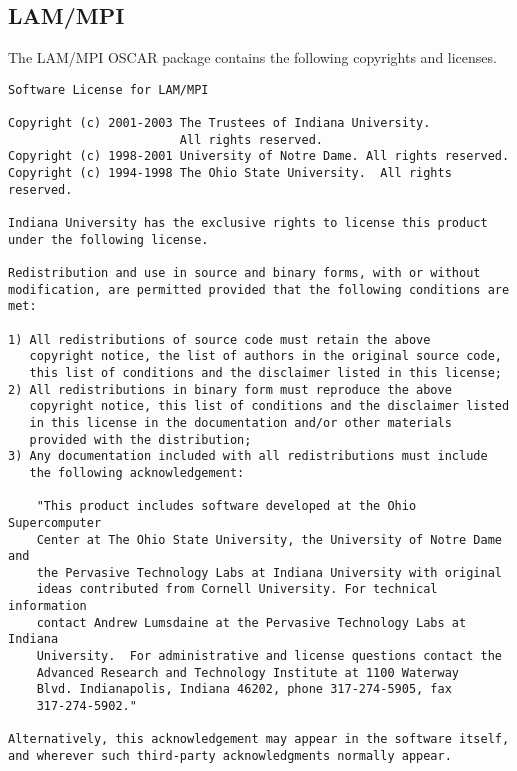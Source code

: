 %
%

\subsection{LAM/MPI}
The LAM/MPI OSCAR package contains the following copyrights and
licenses.

\begin{verbatim}
Software License for LAM/MPI

Copyright (c) 2001-2003 The Trustees of Indiana University.  
                        All rights reserved.
Copyright (c) 1998-2001 University of Notre Dame. All rights reserved.
Copyright (c) 1994-1998 The Ohio State University.  All rights reserved.

Indiana University has the exclusive rights to license this product
under the following license.

Redistribution and use in source and binary forms, with or without
modification, are permitted provided that the following conditions are
met:

1) All redistributions of source code must retain the above
   copyright notice, the list of authors in the original source code,
   this list of conditions and the disclaimer listed in this license; 
2) All redistributions in binary form must reproduce the above
   copyright notice, this list of conditions and the disclaimer listed
   in this license in the documentation and/or other materials
   provided with the distribution; 
3) Any documentation included with all redistributions must include
   the following acknowledgement:

    "This product includes software developed at the Ohio Supercomputer
    Center at The Ohio State University, the University of Notre Dame and
    the Pervasive Technology Labs at Indiana University with original
    ideas contributed from Cornell University. For technical information
    contact Andrew Lumsdaine at the Pervasive Technology Labs at Indiana
    University.  For administrative and license questions contact the
    Advanced Research and Technology Institute at 1100 Waterway
    Blvd. Indianapolis, Indiana 46202, phone 317-274-5905, fax
    317-274-5902."

Alternatively, this acknowledgement may appear in the software itself,
and wherever such third-party acknowledgments normally appear.


\end{verbatim}
